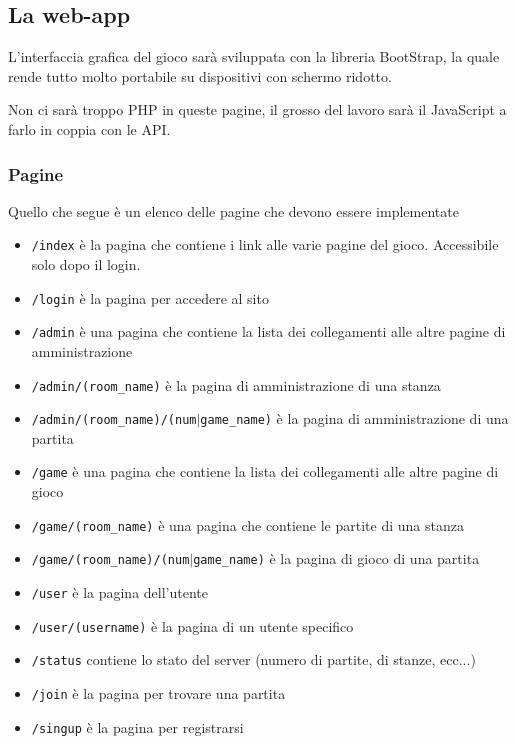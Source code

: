 \documentclass[10pt,a4paper]{article}
\newcommand{\pageurl}[1]{\small\texttt{#1}}
\begin{document}
\subsection{La web-app}
L'interfaccia grafica del gioco sarà sviluppata con la libreria BootStrap, la quale rende tutto molto portabile su dispositivi con schermo ridotto. 

Non ci sarà troppo PHP in queste pagine, il grosso del lavoro sarà il JavaScript a farlo in coppia con le API.

\subsubsection*{Pagine}
Quello che segue è un elenco delle pagine che devono essere implementate
\begin{itemize}
\item \pageurl{/index} è la pagina che contiene i link alle varie pagine del gioco. Accessibile solo dopo il login.
\item \pageurl{/login} è la pagina per accedere al sito
\item \pageurl{/admin} è una pagina che contiene la lista dei collegamenti alle altre pagine di amministrazione 
\item \pageurl{/admin/(room\_name)} è la pagina di amministrazione di una stanza
\item \pageurl{/admin/(room\_name)/(num$|$game\_name)} è la pagina di amministrazione di una partita
\item \pageurl{/game} è una pagina che contiene la lista dei collegamenti alle altre pagine di gioco
\item \pageurl{/game/(room\_name)} è una pagina che contiene le partite di una stanza
\item \pageurl{/game/(room\_name)/(num$|$game\_name)} è la pagina di gioco di una partita
\item \pageurl{/user} è la pagina dell'utente
\item \pageurl{/user/(username)} è la pagina di un utente specifico
\item \pageurl{/status} contiene lo stato del server (numero di partite, di stanze, ecc...)
\item \pageurl{/join} è la pagina per trovare una partita
\item \pageurl{/singup} è la pagina per registrarsi
\end{itemize}

\newpage
\end{document}
